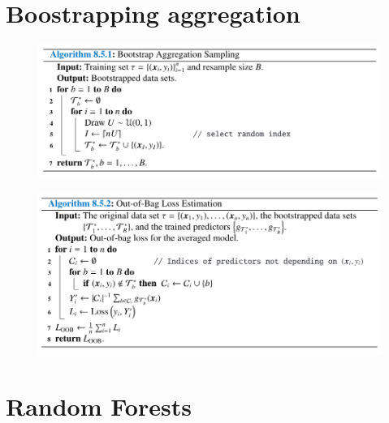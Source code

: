 \documentclass{beamer}
\begin{document}


\section{Boostrapping aggregation}

\begin{frame}
    \begin{figure}
        \includegraphics[width=0.9\linewidth]{A851Kroese}
    \end{figure}
\end{frame}

\begin{frame}
    \begin{figure}
        \includegraphics[width=0.9\linewidth]{A852Kroese}
    \end{figure}
\end{frame}

\section{Random Forests}
\end{document}
